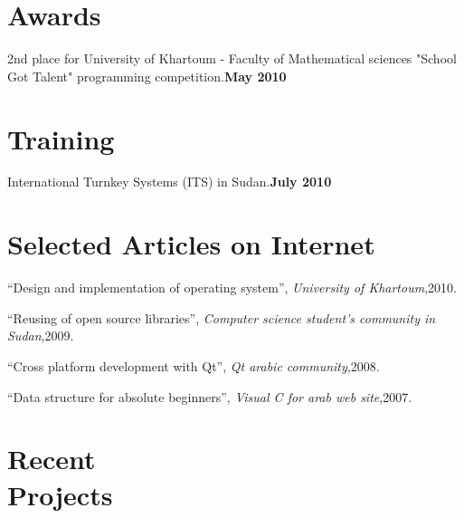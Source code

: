 \documentclass[margin,line]{resume}
\begin{document}
\begin{resume}
    \section{\mysidestyle  Awards} 

2nd place for University of Khartoum - Faculty of Mathematical sciences "School Got Talent" programming competition.\hfill \textbf{May 2010}\vspace{-3mm}\\\vspace{-1mm}%

    \section{\mysidestyle  Training} 

International Turnkey Systems (ITS) in Sudan.\hfill \textbf{July 2010}\vspace{-3mm}\\\vspace{-1mm}%


    \section{\mysidestyle Selected Articles on Internet }
   ``Design and implementation of operating system'',
    \textsl{University of Khartoum},2010.

\vspace{-2mm}
   ``Reusing of open source libraries'',
    \textsl{Computer science student's community in Sudan},2009.

\vspace{-2mm}
   ``Cross platform development with Qt'',
    \textsl{Qt arabic community},2008.

\vspace{-2mm}
   ``Data structure for absolute beginners'',
    \textsl{Visual C for arab web site},2007.

\vspace{-2mm}


    \section{\mysidestyle Recent\\ Projects}


\end{resume}
\end{document}
